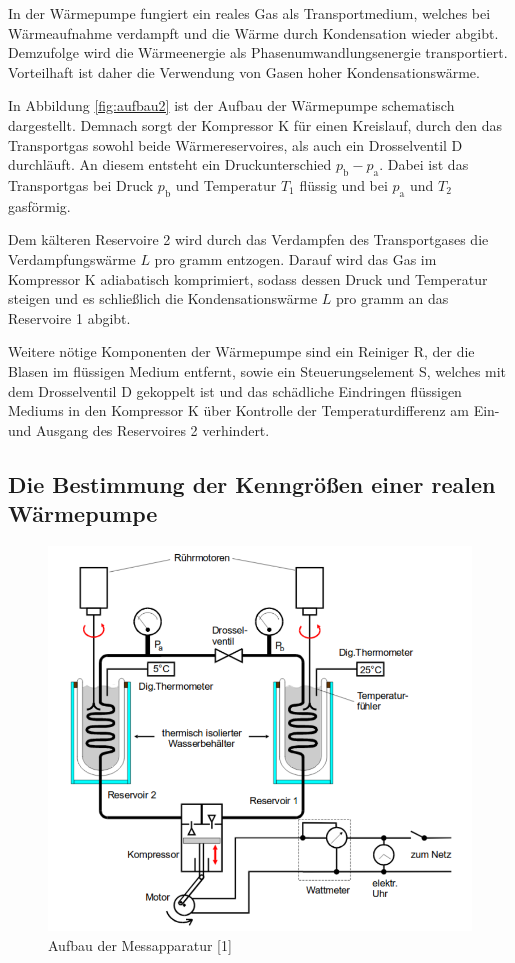 In der Wärmepumpe fungiert ein reales Gas als Transportmedium, welches 
bei Wärmeaufnahme verdampft und die Wärme durch Kondensation wieder abgibt.
Demzufolge wird die Wärmeenergie als Phasenumwandlungsenergie transportiert.
Vorteilhaft ist daher die Verwendung von Gasen hoher Kondensationswärme. 

In Abbildung \ref{fig:aufbau2} ist der Aufbau der Wärmepumpe schematisch 
dargestellt. Demnach sorgt der Kompressor K für einen Kreislauf, durch 
den das Transportgas sowohl beide Wärmereservoires, als auch ein 
Drosselventil D durchläuft. An diesem entsteht ein Druckunterschied 
$p_\text{b} - p_\text{a}$. Dabei ist das Transportgas bei Druck $p_\text{b}$ 
und Temperatur $T_1$ flüssig und bei $p_\text{a}$ und $T_2$ gasförmig.

Dem kälteren Reservoire 2 wird durch das Verdampfen des Transportgases 
die Verdampfungswärme $L$ pro gramm entzogen. Darauf wird das Gas im 
Kompressor K adiabatisch komprimiert, sodass dessen Druck und Temperatur steigen
und es schließlich die Kondensationswärme $L$ pro gramm an das Reservoire 1 abgibt.

Weitere nötige Komponenten der Wärmepumpe sind ein Reiniger R, der die Blasen 
im flüssigen Medium entfernt, sowie ein Steuerungselement S, welches mit dem 
Drosselventil D gekoppelt ist und das schädliche Eindringen flüssigen 
Mediums in den Kompressor K über Kontrolle der Temperaturdifferenz am Ein- 
und Ausgang des Reservoires 2 verhindert.

\subsection{Die Bestimmung der Kenngrößen einer realen Wärmepumpe}

\begin{figure}
    \centering
    \includegraphics[scale=0.7]{aufbau.pdf}
    \caption{Aufbau der Messapparatur [1]}
    \label{fig:aufbau}
\end{figure}


